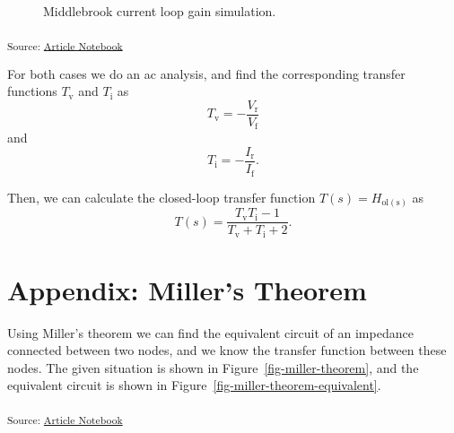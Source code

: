 \documentclass[
  a4paper,
  DIV=11,
  numbers=noendperiod]{scrartcl}
\begin{document}
\begin{figure}[H]


\caption{\label{fig-middlebrook-current}Middlebrook current loop gain
simulation.}

\end{figure}%

\textsubscript{Source:
\href{https://iic-jku.github.io/analog-circuit-design/index.qmd.html}{Article
Notebook}}

For both cases we do an ac analysis, and find the corresponding transfer
functions \(T_\mathrm{v}\) and \(T_\mathrm{i}\) as \[
T_\mathrm{v} = -\frac{V_\mathrm{r}}{V_\mathrm{f}}
\] and \[
T_\mathrm{i} = -\frac{I_\mathrm{r}}{I_\mathrm{f}}.
\]

Then, we can calculate the closed-loop transfer function
\(T(s) = H_\mathrm{ol(s)}\) as \[
T(s) = \frac{T_\mathrm{v} T_\mathrm{i} - 1}{T_\mathrm{v} + T_\mathrm{i} + 2}.
\]

\section{Appendix: Miller's Theorem}\label{sec-miller-theorem}

Using Miller's theorem we can find the equivalent circuit of an
impedance connected between two nodes, and we know the transfer function
between these nodes. The given situation is shown in
Figure~\ref{fig-miller-theorem}, and the equivalent circuit is shown in
Figure~\ref{fig-miller-theorem-equivalent}.

\textsubscript{Source:
\href{https://iic-jku.github.io/analog-circuit-design/index.qmd.html}{Article
Notebook}}
\end{document}
